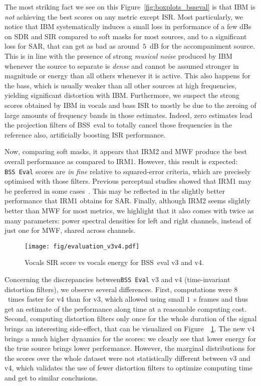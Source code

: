 \documentclass{article}
\begin{document}
The most striking fact we see on this Figure~\ref{fig:boxplots_bsseval} is that IBM is \textit{not} achieving the best scores on any metric except ISR. Most particularly, we notice that IBM systematically induces a small loss in performance of a few dBs on SDR and SIR compared to soft masks for most sources, and to a significant loss for SAR, that can get as bad as around~$5$~dB for the accompaniment source. This is in line with the presence of strong \textit{musical noise} produced by IBM whenever the source to separate is \textit{dense} and cannot be assumed stronger in magnitude or energy than all others whenever it is active. This also happens for the bass, which is usually weaker than all other sources at high frequencies, yielding significant distortion with IBM. Furthermore, we suspect the strong scores obtained by IBM in vocals and bass ISR to mostly be due to the zeroing of large amounts of frequency bands in those estimates. Indeed, zero estimates lead the projection filters of BSS~eval to totally cancel those frequencies in the reference also, artificially boosting ISR performance.

Now, comparing soft masks, it appears that IRM2 and MWF produce the best overall performance as compared to IRM1. However, this result is expected: \texttt{BSS~Eval} scores are \textit{in fine} relative to squared-error criteria, which are precisely optimised with those filters. Previous perceptual studies showed that IRM1 may be preferred in some cases~\cite{liutkus15}. This may be reflected in the slightly better performance that IRM1 obtains for SAR. Finally, although IRM2 seems slightly better than MWF for most metrics, we highlight that it also comes with twice as many parameters: power spectral densities for left and right channels, instead of just one for MWF, shared across channels.

\begin{figure}[ht]
  \begin{center}
     \texttt{[image: fig/evaluation\_v3v4.pdf]}
  \end{center}
  \caption{Vocals SIR score vs vocals energy for BSS~eval v3 and v4.}%
\label{fig:v3v4}
\end{figure}

Concerning the discrepancies between\texttt{BSS~Eval} v3 and v4 (time-invariant distortion filters), we observe several differences. First, computations were $8$~times faster for v4 than for v3, which allowed using small $1$~s frames and thus get an estimate of the performance along time at a reasonable computing cost. Second, computing distortion filters only once for the whole duration of the signal brings an interesting side-effect, that can be visualized on Figure~~\ref{fig:v3v4}. The new v4 brings a much higher dynamics for the scores: we clearly see that lower energy for the true source brings lower performance. However, the marginal distributions for the scores over the whole dataset were not statistically different between v3 and v4, which validates the use of fewer distortion filters to optimize computing time and get to similar conclusions.
\end{document}
